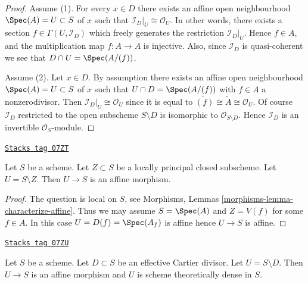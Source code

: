 \begin{proof}
Assume (1).  For every $x \in D$ there exists an affine open neighbourhood
$\Spec(A) = U \subset S$ of $x$ such that
$\mathcal{I}_D|_U \cong \mathcal{O}_U$. In other words, there exists
a section $f \in \Gamma(U, \mathcal{I}_D)$ which freely generates the
restriction $\mathcal{I}_D|_U$. Hence $f \in A$, and the multiplication
map $f : A \to A$ is injective. Also, since $\mathcal{I}_D$ is
quasi-coherent we see that $D \cap U = \Spec(A/(f))$.

\medskip\noindent
Assume (2). Let $x \in D$. By assumption there exists an affine open
neighbourhood $\Spec(A) = U \subset S$ of $x$ such that
$U \cap D = \Spec(A/(f))$ with $f \in A$ a nonzerodivisor.
Then $\mathcal{I}_D|_U \cong \mathcal{O}_U$ since it is equal to
$\widetilde{(f)} \cong \widetilde{A} \cong \mathcal{O}_U$.
Of course $\mathcal{I}_D$ restricted to the open subscheme
$S \setminus D$ is isomorphic to $\mathcal{O}_{S \setminus D}$.
Hence $\mathcal{I}_D$ is an invertible $\mathcal{O}_S$-module.
\end{proof}

\begin{lemma}
\label{divisors-lemma-complement-locally-principal-closed-subscheme}
\href{https://stacks.math.columbia.edu/tag/07ZT}{\texttt{Stacks tag 07ZT}}

Let $S$ be a scheme. Let $Z \subset S$ be a locally principal closed
subscheme. Let $U = S \setminus Z$. Then $U \to S$ is an affine morphism.
\end{lemma}

\begin{proof}
The question is local on $S$, see
Morphisms, Lemmas \ref{morphisms-lemma-characterize-affine}.
Thus we may assume $S = \Spec(A)$ and $Z = V(f)$ for some $f \in A$.
In this case $U = D(f) = \Spec(A_f)$ is affine hence $U \to S$ is affine.
\end{proof}

\begin{lemma}
\label{divisors-lemma-complement-effective-Cartier-divisor}
\href{https://stacks.math.columbia.edu/tag/07ZU}{\texttt{Stacks tag 07ZU}}

Let $S$ be a scheme. Let $D \subset S$ be an effective Cartier divisor.
Let $U = S \setminus D$. Then $U \to S$ is an affine morphism and $U$
is scheme theoretically dense in $S$.
\end{lemma}

